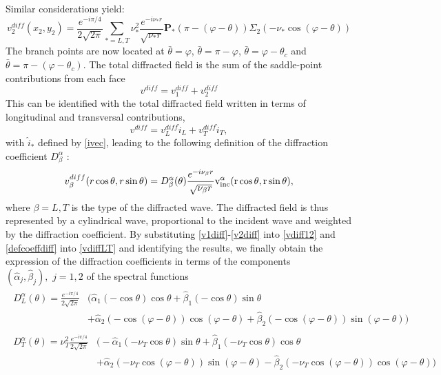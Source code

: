 Similar considerations yield:
\begin{equation}
v_2^{diff}(x_2,y_2)=\frac{e^{-i\pi/4}}{2\sqrt{2\pi}}\sum_{*=L,T}\nu_*^2\frac{e^{-i\nu_*r}}{\sqrt{\nu_*r}}\mathbf{P_*}(\pi-(\varphi-\theta))\Sigma_2(-\nu_*\cos(\varphi-\theta))
\label{v2diff}
\end{equation}
The branch points are now located at $\bar{\theta}=\varphi$, $\bar{\theta}=\pi-\varphi$, $\bar{\theta}=\varphi-\theta_c$ and $\bar{\theta}=\pi-(\varphi-\theta_c)$.
The total diffracted field is the sum of the saddle-point contributions from each face
\begin{equation}
v^{diff}=v_1^{diff}+v_2^{diff}
\label{vdiff12}
\end{equation}
This can be identified with the total diffracted field written in terms of longitudinal and transversal contributions, 
\begin{equation}
v^{diff}=v^{diff}_L \hat{i}_L+v^{diff}_T \hat{i}_T,
\label{vdiffLT}
\end{equation}
with $\hat{i}_*$ defined by \eqref{ivec}, leading to the following definition of the diffraction coefficient $D_{\beta}^{\alpha}$ : 
\begin{equation}
v_{\beta}^{diff}(r\cos\theta,r\sin\theta)=D_{\beta}^{\alpha}(\theta)\frac{e^{-i\nu_{\beta}r}}{\sqrt{\nu_{\beta}r}} \rm v^{\alpha}_{inc}(r\cos\theta,r\sin\theta),
\label{defcoeffdiff}
\end{equation}
where $\beta=L,T$ is the type of the diffracted wave. The diffracted field is thus represented by a cylindrical wave, proportional to the incident wave and weighted by the diffraction coefficient. By substituting \eqref{v1diff}-\eqref{v2diff} into \eqref{vdiff12} and \eqref{defcoeffdiff} into \eqref{vdiffLT} and identifying the results, we finally obtain the expression of the diffraction coefficients in terms of the components $(\hat{\alpha}_j,\hat{\beta}_j), \, \, j=1,2$ of the spectral functions
\begin{gather}
\begin{split}
 D^{\alpha}_L(\theta)=\frac{e^{-i\pi/4}}{2\sqrt{2\pi}}&\big(\hat{\alpha}_1(-\cos\theta)\cos\theta+\hat{\beta}_1(-\cos\theta)\sin\theta\\
&+\hat{\alpha}_2(-\cos(\varphi-\theta))\cos(\varphi-\theta)+\hat{\beta}_2(-\cos(\varphi-\theta))\sin(\varphi-\theta)\big)
\end{split} \label{DL}\\
\begin{split}
 D^{\alpha}_T(\theta)=\nu_T^2\frac{e^{-i\pi/4}}{2\sqrt{2\pi}}&\big(-\hat{\alpha}_1(-\nu_T\cos\theta)\sin\theta+\hat{\beta}_1(-\nu_T\cos\theta)\cos\theta\\
&+\hat{\alpha}_2(-\nu_T\cos(\varphi-\theta))\sin(\varphi-\theta)-\hat{\beta}_2(-\nu_T\cos(\varphi-\theta))\cos(\varphi-\theta)\big) 
\end{split} \label{DT}
\end{gather}

